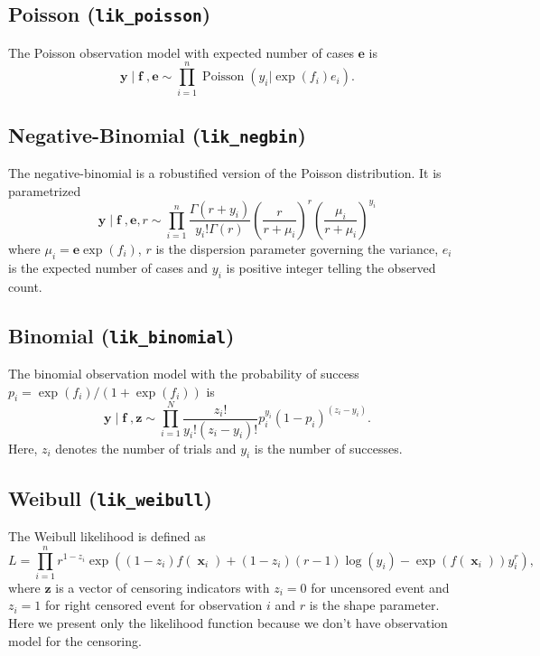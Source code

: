 \documentclass[twoside,11pt]{article}
\DeclareMathOperator{\x}{\mathbf{x}}
\DeclareMathOperator{\f}{\mathbf{f}}
\DeclareMathOperator{\y}{\mathbf{y}}
\DeclareMathOperator{\Poisson}{Poisson}
\newcommand{\mb}{\mathbf}
\newcommand{\code}[1]{{\normalfont\texttt{#1}}}
\begin{document}
\subsection*{Poisson (\code{lik\_poisson})}

The Poisson observation model with expected number of cases $\mb{e}$ is
%
\begin{equation}
 \y|\f,\mb{e}  \sim \prod_{i=1}^{n} \Poisson(y_i|\exp(f_i)e_i).
\end{equation}

\subsection*{Negative-Binomial (\code{lik\_negbin})}

The negative-binomial is a robustified version of the Poisson
distribution. It is parametrized
%
\begin{equation}
 \y |\f,\mb{e}, r  \sim \prod_{i=1}^n
 \frac{\Gamma(r+y_i)}{y_i!\Gamma(r)}
\left(\frac{r}{r+\mu_i}\right)^r \left(\frac{\mu_i}{r+\mu_i}\right)^{y_i}
\end{equation}
%
where $\mu_i = \mb{e}\exp(f_i)$, $r$ is the dispersion parameter
governing the variance, $e_i$ is the expected number of cases and
$y_i$ is positive integer telling the observed count.

\subsection*{Binomial (\code{lik\_binomial})}

The binomial observation model with the probability of success $p_i =
\exp(f_i)/ (1+\exp(f_i))$ is
%
\begin{equation}
\y|\f,\mathbf{z} \sim \prod_{i=1}^N \frac{z_i!}{y_i!(z_i-y_i)!} p_i^{y_i}(1-p_i)^{(z_i-y_i)}.
\end{equation}
%
Here, $z_i$ denotes the number of trials and $y_i$ is the number of
successes.

\subsection*{Weibull (\code{lik\_weibull})}

The Weibull likelihood is defined as
\begin{equation}
  L = \prod_{i=1}^n r^{1-z_i} \exp \left( (1-z_i)f(\x_i)+(1-z_i)(r-1)\log(y_i)-\exp(f(\x_i))y_i^r \right),
\end{equation}
where $\mathbf{z}$ is a vector of censoring indicators with $z_i = 0$ for
uncensored event and $z_i = 1$ for right censored event for
observation $i$ and $r$ is the shape parameter. Here we present only the likelihood function because we don't have observation model for the censoring.
\end{document}

